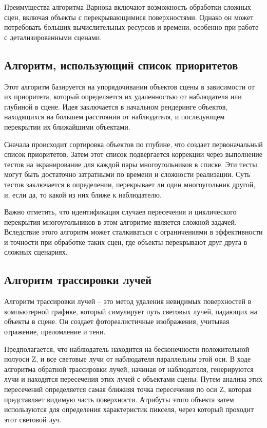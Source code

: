 Преимущества алгоритма Варнока включают возможность обработки сложных сцен, включая объекты с перекрывающимися поверхностями. 
Однако он может потребовать больших вычислительных ресурсов и времени, особенно при работе с детализированными сценами. 

\subsection{Алгоритм, использующий список приоритетов}

Этот алгоритм базируется на упорядочивании объектов сцены в зависимости от их приоритета, который определяется их удаленностью от наблюдателя или глубиной в сцене. 
Идея заключается в начальном рендеринге объектов, находящихся на большем расстоянии от наблюдателя, и последующем перекрытии их ближайшими объектами.

Сначала происходит сортировка объектов по глубине, что создает первоначальный список приоритетов. 
Затем этот список подвергается коррекции через выполнение тестов на экранирование для каждой пары многоугольников в списке. 
Эти тесты могут быть достаточно затратными по времени и сложности реализации. 
Суть тестов заключается в определении, перекрывает ли один многоугольник другой, и, если да, то какой из них ближе к наблюдателю.

Важно отметить, что идентификация случаев пересечения и циклического перекрытия многоугольников в этом алгоритме является сложной задачей. 
Вследствие этого алгоритм может сталкиваться с ограничениями в эффективности и точности при обработке таких сцен, где объекты перекрывают друг друга в сложных сценариях.

\subsection{Алгоритм трассировки лучей}

Алгоритм трассировки лучей -- это метод удаления невидимых поверхностей в компьютерной графике, который симулирует путь световых лучей, падающих на объекты в сцене. 
Он создает фотореалистичные изображения, учитывая отражение, преломление и тени. 

Предполагается, что наблюдатель находится на бесконечности положительной полуоси Z, и все световые лучи от наблюдателя параллельны этой оси. 
В ходе алгоритма обратной трассировки лучей, начиная от наблюдателя, генерируются лучи и находятся пересечения этих лучей с объектами сцены. 
Путем анализа этих пересечений определяется самая ближняя точка пересечения по оси Z, которая представляет видимую часть поверхности. 
Атрибуты этого объекта затем используются для определения характеристик пикселя, через который проходит этот световой луч.

